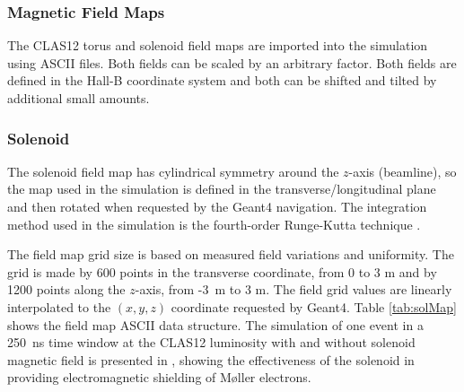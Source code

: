 \subsubsection{Magnetic Field Maps} \label{sec:clas12FieldMaps}

The CLAS12 torus and solenoid field maps are imported into the simulation using ASCII files.
Both fields can be scaled by an arbitrary factor.
Both fields are defined in the Hall-B coordinate system and both can be shifted and tilted by additional small amounts.

\subsubsection{Solenoid}
The solenoid field map has cylindrical symmetry around the $z$-axis (beamline), so the map used in the simulation is defined
in the transverse/longitudinal plane and then rotated when requested by the Geant4 navigation.
The integration method used in the simulation is the fourth-order Runge-Kutta technique \cite{rungeKutta}.

The field map grid size is based on measured field variations and uniformity. The grid is made by 600 points
in the transverse coordinate, from 0 to 3 m and by 1200 points along the $z$-axis, from \mbox{-3 m} to 3 m.
The field grid values are linearly interpolated to the $(x,y,z)$ coordinate requested by Geant4.
Table \ref{tab:solMap} shows the field map ASCII data structure. The simulation of one event in a 250~ns time window at
the CLAS12 luminosity with and without solenoid magnetic field is presented in , showing the effectiveness
of the solenoid in providing electromagnetic shielding of M\o ller electrons.


